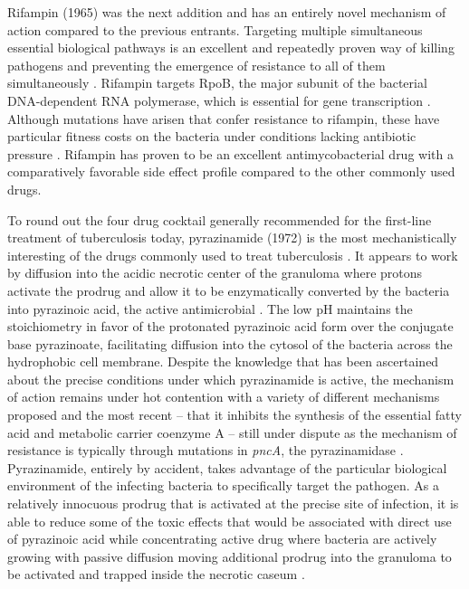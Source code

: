 Rifampin (1965) was the next addition and has an entirely novel mechanism of action compared to the previous entrants. Targeting multiple simultaneous essential biological pathways is an excellent and repeatedly proven way of killing pathogens and preventing the emergence of resistance to all of them simultaneously \citep{Pletz2017}. Rifampin targets RpoB, the major subunit of the bacterial DNA\hyp{}dependent RNA polymerase, which is essential for gene transcription \citep{Wehrli1983}. Although mutations have arisen that confer resistance to rifampin, these have particular fitness costs on the bacteria under conditions lacking antibiotic pressure \citep{Mariam2004, Xu2021, Gagneux2006b, Billington1999, Gagneux2009}. Rifampin has proven to be an excellent antimycobacterial drug with a comparatively favorable side effect profile compared to the other commonly used drugs.

To round out the four drug cocktail generally recommended for the first\hyp{}line treatment of tuberculosis today, pyrazinamide (1972) is the most mechanistically interesting of the drugs commonly used to treat tuberculosis \citep{Yeager1952, Steele1988, Millard2019}. It appears to work by diffusion into the acidic necrotic center of the granuloma where protons activate the prodrug and allow it to be enzymatically converted by the bacteria into pyrazinoic acid, the active antimicrobial \citep{Zhang2013, Zhang2019, Kalinda2012, Lamont2020, Lamont2019}. The low pH maintains the stoichiometry in favor of the protonated pyrazinoic acid form over the conjugate base pyrazinoate, facilitating diffusion into the cytosol of the bacteria across the hydrophobic cell membrane. Despite the knowledge that has been ascertained about the precise conditions under which pyrazinamide is active, the mechanism of action remains under hot contention with a variety of different mechanisms proposed and the most recent -- that it inhibits the synthesis of the essential fatty acid and metabolic carrier coenzyme A -- still under dispute as the mechanism of resistance is typically through mutations in \textit{pncA}, the pyrazinamidase \citep{Kalinda2012, Shi2011, Lamont2020, Dillon2017, Zhang2014a, Zhang2003}. Pyrazinamide, entirely by accident, takes advantage of the particular biological environment of the infecting bacteria to specifically target the pathogen. As a relatively innocuous prodrug that is activated at the precise site of infection, it is able to reduce some of the toxic effects that would be associated with direct use of pyrazinoic acid while concentrating active drug where bacteria are actively growing with passive diffusion moving additional prodrug into the granuloma to be activated and trapped inside the necrotic caseum \citep{Wade2004, Gopal2016}.

